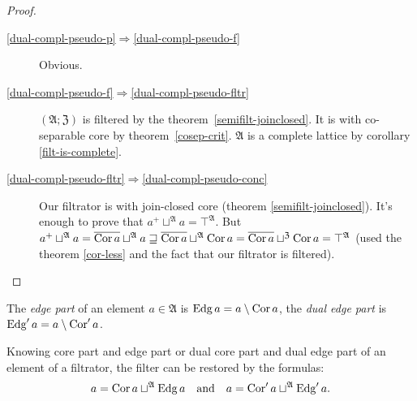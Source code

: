 \begin{proof}
~
\begin{description}
\item [{\ref{dual-compl-pseudo-p}$\Rightarrow$\ref{dual-compl-pseudo-f}}] Obvious.
\item [{\ref{dual-compl-pseudo-f}$\Rightarrow$\ref{dual-compl-pseudo-fltr}}] $(\mathfrak{A};\mathfrak{Z})$
is filtered by the theorem~\ref{semifilt-joinclosed}. It is with
co-separable core by theorem~\ref{cosep-crit}. $\mathfrak{A}$ is
a complete lattice by corollary \ref{filt-is-complete}.
\item [{\ref{dual-compl-pseudo-fltr}$\Rightarrow$\ref{dual-compl-pseudo-conc}}] Our
filtrator is with join-closed core (theorem \ref{semifilt-joinclosed}).
It's enough to prove that $a^{+}\sqcup^{\mathfrak{A}}a=\top^{\mathfrak{A}}$.
But $a^{+}\sqcup^{\mathfrak{A}}a=\overline{\operatorname{Cor} a}\sqcup^{\mathfrak{A}}a\sqsupseteq\overline{\operatorname{Cor} a}\sqcup^{\mathfrak{A}}\operatorname{Cor} a=\overline{\operatorname{Cor} a}\sqcup^{\mathfrak{Z}}\operatorname{Cor} a=\top^{\mathfrak{A}}$
(used the theorem \ref{cor-less} and the fact that our filtrator
is filtered).
\end{description}
\end{proof}
\begin{defn}
The \emph{edge part} of an element $a\in\mathfrak{A}$
is $\operatorname{Edg} a=a\setminus\operatorname{Cor} a$, the \emph{dual edge part} is $\operatorname{Edg}'a=a\setminus\operatorname{Cor}'a$.
\end{defn}
Knowing core part and edge part or dual core part and dual edge part
of an element of a filtrator, the filter can be restored by the formulas:
\[
a=\operatorname{Cor} a\sqcup^{\mathfrak{A}}\operatorname{Edg} a\quad\text{and}\quad a=\operatorname{Cor}'a\sqcup^{\mathfrak{A}}\operatorname{Edg}'a.
\]

